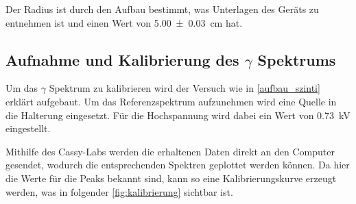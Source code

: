 \documentclass[12pt,english,ngerman]{scrartcl}
\begin{document}
Der Radius ist durch den Aufbau bestimmt, was Unterlagen des Geräts zu
entnehmen ist und einen Wert von \SI{5.00(3)}{\cm}
hat.\cite{zaehlrohrvorbereitung}

\begin{table}[H]
	\caption[Verzeichnete Zerfälle bei entsprechendem Magnetfeld]{
		Verzeichnete Zerfälle bei
		entsprechendem Magnetfeld bei einer Torzeit von \SI{100}{\second}. Dabei sind
		die Counts exakte Werte.                \\
		\(B \dots\) Stärke des Magnetfelds in \si{\milli\tesla} mit einer
		Unsicherheit von \SI{0.2}{\milli\tesla} \\
		\(n \dots\) erhaltene bei erhaltene Anzahl an
		Zerfällen bei entsprechendem Magnetfeld
	}\label{tab:magnetspektrometer}
	\begin{center}
		
	\end{center}
\end{table}

\subsection{Aufnahme und Kalibrierung des \texorpdfstring{$\gamma$}{gamma}
	Spektrums}\label{sec:aufname_kalibrierungsspektrum}

Um das \(\gamma\) Spektrum zu kalibrieren wird der Versuch wie in
\autoref{aufbau_szinti} erklärt aufgebaut. Um das Referenzspektrum aufzunehmen
wird eine  Quelle in die Halterung eingesetzt. Für die
Hochspannung wird dabei ein Wert von \SI{0.73}{\kilo\volt} eingestellt.

Mithilfe des Cassy-Labs werden die erhaltenen Daten direkt an den Computer
gesendet, wodurch die entsprechenden Spektren geplottet werden können. Da hier
die Werte für die Peaks bekannt sind, kann so eine Kalibrierungskurve erzeugt
werden, was in folgender \autoref{fig:kalibrierung} sichtbar ist.
\end{document}
